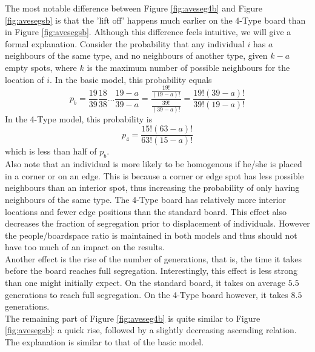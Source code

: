 The most notable difference between Figure \ref{fig:aveseg4b} and Figure \ref{fig:avesegsb} is that the 'lift off' happens much earlier on the 4-Type board than in Figure \ref{fig:avesegsb}. 
Although this difference feels intuitive, we will give a formal explanation. 
Consider the probability that any individual $i$ has $a$ neighbours of the same type, and no neighbours of another type, given $k-a$ empty spots, where $k$ is the maximum number of possible neighbours for the location of $i$. 
In the basic model, this probability equals
\[
p_b = \frac{19}{39}\frac{18}{38}...\frac{19-a}{39-a} = \frac{\frac{19!}{(19-a)!}}{\frac{39!}{(39-a)!}} = \frac{19!(39-a)!}{39!(19-a)!}
\]
In the 4-Type model, this probability is
\[
p_4 = \frac{15!(63-a)!}{63!(15-a)!}
\]
which is less than half of $p_b$.\\

Also note that an individual is more likely to be homogenous if he/she is placed in a corner or on an edge. 
This is because a corner or edge spot has less possible neighbours than an interior spot, thus increasing the probability of only having neighbours of the same type. 
The 4-Type board has relatively more interior locations and fewer edge positions than the standard board. This effect also decreases the fraction of segregation prior to displacement of individuals.
However the people/boardspace ratio is maintained in both models and thus should not have too much of an impact on the results.\\

Another effect is the rise of the number of generations, that is, the time it takes before the board reaches full segregation. 
Interestingly, this effect is less strong than one might initially expect. 
On the standard board, it takes on average $5.5$ generations to reach full segregation. On the 4-Type board however, it takes $8.5$ generations.\\

The remaining part of Figure \ref{fig:aveseg4b} is quite similar to Figure \ref{fig:avesegsb}: a quick rise, followed by a slightly decreasing ascending relation. 
The explanation is similar to that of the basic model.
